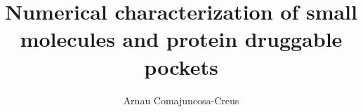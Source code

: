 \title{Numerical characterization of small molecules and protein druggable pockets}
\author{Arnau Comajuncosa-Creus}



